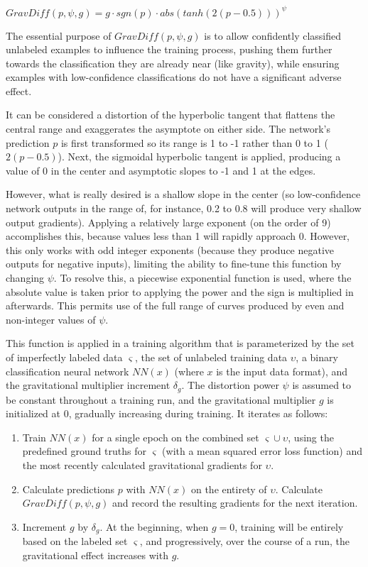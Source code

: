 \documentclass[10pt]{article}
\begin{document}
$GravDiff(p, \psi, g) = g \cdot sgn(p) \cdot abs(tanh(2(p - 0.5))) ^ \psi$

The essential purpose of $GravDiff(p, \psi, g)$ is to allow confidently classified unlabeled examples to influence the training process, pushing them further towards the classification they are already near (like gravity), while ensuring examples with low-confidence classifications do not have a significant adverse effect.

It can be considered a distortion of the hyperbolic tangent that flattens the central range and exaggerates the asymptote on either side. The network's prediction $p$ is first transformed so its range is 1 to -1 rather than 0 to 1 ($2(p - 0.5)$). Next, the sigmoidal hyperbolic tangent is applied, producing a value of 0 in the center and asymptotic slopes to -1 and 1 at the edges.

However, what is really desired is a shallow slope in the center (so low-confidence network outputs in the range of, for instance, 0.2 to 0.8 will produce very shallow output gradients). Applying a relatively large exponent (on the order of 9) accomplishes this, because values less than 1 will rapidly approach 0. However, this only works with odd integer exponents (because they produce negative outputs for negative inputs), limiting the ability to fine-tune this function by changing $\psi$. To resolve this, a piecewise exponential function is used, where the absolute value is taken prior to applying the power and the sign is multiplied in afterwards. This permits use of the full range of curves produced by even and non-integer values of $\psi$.

This function is applied in a training algorithm that is parameterized by the set of imperfectly labeled data $\varsigma$, the set of unlabeled training data $\upsilon$, a binary classification neural network $NN(x)$ (where $x$ is the input data format), and the gravitational multiplier increment $\delta_g$. The distortion power $\psi$ is assumed to be constant throughout a training run, and the gravitational multiplier $g$ is initialized at 0, gradually increasing during training. It iterates as follows:

\begin{enumerate}
    \item Train $NN(x)$ for a single epoch on the combined set $\varsigma \cup \upsilon$, using the predefined ground truths for $\varsigma$ (with a mean squared error loss function) and the most recently calculated gravitational gradients for $\upsilon$.
    \item Calculate predictions $p$ with $NN(x)$ on the entirety of $\upsilon$. Calculate $GravDiff(p, \psi, g)$ and record the resulting gradients for the next iteration.
    \item Increment $g$ by $\delta_{g}$. At the beginning, when $g = 0$, training will be entirely based on the labeled set $\varsigma$, and progressively, over the course of a run, the gravitational effect increases with $g$.
\end{enumerate}
\end{document}

